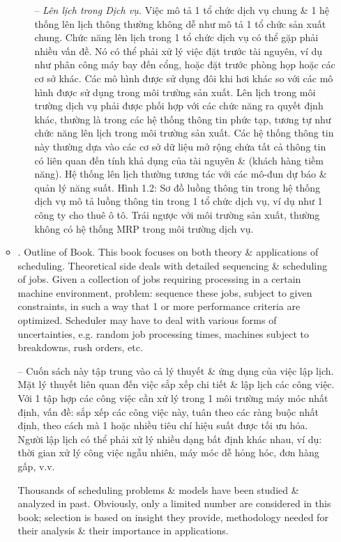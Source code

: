 \documentclass{article}
\begin{document}
\begin{itemize}
\begin{itemize}
\begin{itemize}
            -- {\it Lên lịch trong Dịch vụ.} Việc mô tả 1 tổ chức dịch vụ chung \& 1 hệ thống lên lịch thông thường không dễ như mô tả 1 tổ chức sản xuất chung. Chức năng lên lịch trong 1 tổ chức dịch vụ có thể gặp phải nhiều vấn đề. Nó có thể phải xử lý việc đặt trước tài nguyên, ví dụ như phân công máy bay đến cổng, hoặc đặt trước phòng họp hoặc các cơ sở khác. Các mô hình được sử dụng đôi khi hơi khác so với các mô hình được sử dụng trong môi trường sản xuất. Lên lịch trong môi trường dịch vụ phải được phối hợp với các chức năng ra quyết định khác, thường là trong các hệ thống thông tin phức tạp, tương tự như chức năng lên lịch trong môi trường sản xuất. Các hệ thống thông tin này thường dựa vào các cơ sở dữ liệu mở rộng chứa tất cả thông tin có liên quan đến tính khả dụng của tài nguyên \& (khách hàng tiềm năng). Hệ thống lên lịch thường tương tác với các mô-đun dự báo \& quản lý năng suất. {\sf Hình 1.2: Sơ đồ luồng thông tin trong hệ thống dịch vụ} mô tả luồng thông tin trong 1 tổ chức dịch vụ, ví dụ như 1 công ty cho thuê ô tô. Trái ngược với môi trường sản xuất, thường không có hệ thống MRP trong môi trường dịch vụ.
        \end{itemize}
        \item {. Outline of Book.} This book focuses on both theory \& applications of scheduling. Theoretical side deals with detailed sequencing \& scheduling of jobs. Given a collection of jobs requiring processing in a certain machine environment, problem: sequence these jobs, subject to given constraints, in such a way that 1 or more performance criteria are optimized. Scheduler may have to deal with various forms of uncertainties, e.g. random job processing times, machines subject to breakdowns, rush orders, etc.

        -- Cuốn sách này tập trung vào cả lý thuyết \& ứng dụng của việc lập lịch. Mặt lý thuyết liên quan đến việc sắp xếp chi tiết \& lập lịch các công việc. Với 1 tập hợp các công việc cần xử lý trong 1 môi trường máy móc nhất định, vấn đề: sắp xếp các công việc này, tuân theo các ràng buộc nhất định, theo cách mà 1 hoặc nhiều tiêu chí hiệu suất được tối ưu hóa. Người lập lịch có thể phải xử lý nhiều dạng bất định khác nhau, ví dụ: thời gian xử lý công việc ngẫu nhiên, máy móc dễ hỏng hóc, đơn hàng gấp, v.v.

        Thousands of scheduling problems \& models have been studied \& analyzed in past. Obviously, only a limited number are considered in this book; selection is based on insight they provide, methodology needed for their analysis \& their importance in applications.


\end{itemize}
\end{itemize}
\end{document}
